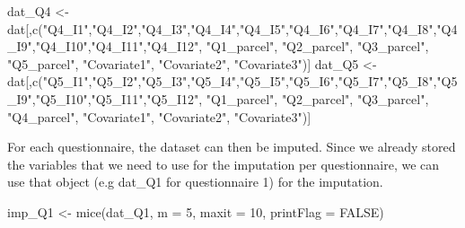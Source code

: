 \documentclass[
]{book}
\newenvironment{Shaded}{\begin{snugshade}}{\end{snugshade}}
\newcommand{\AttributeTok}[1]{\textcolor[rgb]{0.77,0.63,0.00}{#1}}
\newcommand{\ConstantTok}[1]{\textcolor[rgb]{0.00,0.00,0.00}{#1}}
\newcommand{\DecValTok}[1]{\textcolor[rgb]{0.00,0.00,0.81}{#1}}
\newcommand{\FunctionTok}[1]{\textcolor[rgb]{0.00,0.00,0.00}{#1}}
\newcommand{\NormalTok}[1]{#1}
\newcommand{\OtherTok}[1]{\textcolor[rgb]{0.56,0.35,0.01}{#1}}
\newcommand{\StringTok}[1]{\textcolor[rgb]{0.31,0.60,0.02}{#1}}
\begin{document}
\begin{Shaded}
\begin{Highlighting}[]
\NormalTok{dat\_Q4 }\OtherTok{\textless{}{-}}\NormalTok{ dat[,}\FunctionTok{c}\NormalTok{(}\StringTok{"Q4\_I1"}\NormalTok{,}\StringTok{"Q4\_I2"}\NormalTok{,}\StringTok{"Q4\_I3"}\NormalTok{,}\StringTok{"Q4\_I4"}\NormalTok{,}\StringTok{"Q4\_I5"}\NormalTok{,}\StringTok{"Q4\_I6"}\NormalTok{,}\StringTok{"Q4\_I7"}\NormalTok{,}\StringTok{"Q4\_I8"}\NormalTok{,}\StringTok{"Q4\_I9"}\NormalTok{,}\StringTok{"Q4\_I10"}\NormalTok{,}\StringTok{"Q4\_I11"}\NormalTok{,}\StringTok{"Q4\_I12"}\NormalTok{, }
                    \StringTok{"Q1\_parcel"}\NormalTok{, }\StringTok{"Q2\_parcel"}\NormalTok{, }\StringTok{"Q3\_parcel"}\NormalTok{, }\StringTok{"Q5\_parcel"}\NormalTok{,}
                    \StringTok{"Covariate1"}\NormalTok{, }\StringTok{"Covariate2"}\NormalTok{, }\StringTok{"Covariate3"}\NormalTok{)]}
\NormalTok{dat\_Q5 }\OtherTok{\textless{}{-}}\NormalTok{ dat[,}\FunctionTok{c}\NormalTok{(}\StringTok{"Q5\_I1"}\NormalTok{,}\StringTok{"Q5\_I2"}\NormalTok{,}\StringTok{"Q5\_I3"}\NormalTok{,}\StringTok{"Q5\_I4"}\NormalTok{,}\StringTok{"Q5\_I5"}\NormalTok{,}\StringTok{"Q5\_I6"}\NormalTok{,}\StringTok{"Q5\_I7"}\NormalTok{,}\StringTok{"Q5\_I8"}\NormalTok{,}\StringTok{"Q5\_I9"}\NormalTok{,}\StringTok{"Q5\_I10"}\NormalTok{,}\StringTok{"Q5\_I11"}\NormalTok{,}\StringTok{"Q5\_I12"}\NormalTok{, }
                    \StringTok{"Q1\_parcel"}\NormalTok{, }\StringTok{"Q2\_parcel"}\NormalTok{, }\StringTok{"Q3\_parcel"}\NormalTok{, }\StringTok{"Q4\_parcel"}\NormalTok{,}
                    \StringTok{"Covariate1"}\NormalTok{, }\StringTok{"Covariate2"}\NormalTok{, }\StringTok{"Covariate3"}\NormalTok{)]}
\end{Highlighting}
\end{Shaded}

For each questionnaire, the dataset can then be imputed. Since we already stored the variables that we need to use for the imputation per questionnaire, we can use that object (e.g dat\_Q1 for questionnaire 1) for the imputation.

\begin{Shaded}
\begin{Highlighting}[]
\NormalTok{imp\_Q1 }\OtherTok{\textless{}{-}} \FunctionTok{mice}\NormalTok{(dat\_Q1, }\AttributeTok{m =} \DecValTok{5}\NormalTok{, }\AttributeTok{maxit =} \DecValTok{10}\NormalTok{, }\AttributeTok{printFlag =} \ConstantTok{FALSE}\NormalTok{)}
\end{Highlighting}
\end{Shaded}
\end{document}
